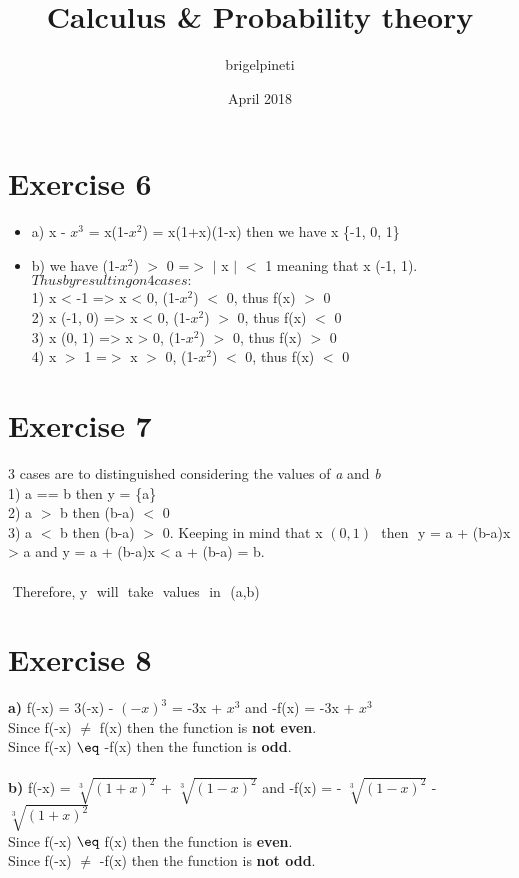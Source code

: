 \documentclass{article}
\title{Calculus & Probability theory}
\author{brigelpineti }
\date{April 2018}
\begin{document}
  \maketitle
  \section*{Exercise 6}
  \begin{itemize}
  
  \item a) x - $x^3$ = x(1-$x^2$) = x(1+x)(1-x) then we have x \in \{-1, 0, 1\} 
  
  \item b) we have (1-$x^2$) $>$ 0 =$>$ $\vert$ x $\vert$ $<$ 1 meaning that x \in (-1, 1). \\ 
  $Thus by resulting on 4 cases:$ \\
  1) x < -1 => x < 0, (1-$x^2$) $<$ 0, thus f(x) $>$ 0 \\
  2) x \in (-1, 0) => x < 0, (1-$x^2$) $>$ 0, thus f(x) $<$ 0 \\
  3) x \in (0, 1) => x > 0, (1-$x^2$) $>$ 0, thus f(x) $>$ 0 \\
  4) x $>$ 1 =$>$ x $>$ 0, (1-$x^2$) $<$ 0, thus f(x) $<$ 0
  \end{itemize}
  
  \section*{Exercise 7}
  
  3 cases are to distinguished considering the values of \textit{a} and \textit{b} \\
  1) a == b then y = \{a\} \\
  2) a $>$ b then (b-a) $<$ 0 \\
  3) a $<$ b then (b-a) $>$ 0. Keeping in mind that x \in $(0,1)$ $ $ then $ $ y = a + (b-a)x > a and y = a + (b-a)x < a + (b-a) = b.  $ $\\ \\
  $ $ Therefore, y $ $ will $ $ take $ $ values $ $ in $ $ (a,b) \\ 
  
  \section*{Exercise 8}
  
  \textbf{a)} f(-x) = 3(-x) - $(-x)^3$ = -3x + $x^3$ and -f(x) = -3x + $x^3$ \\
  Since f(-x) $\neq$ f(x) then the function is \textbf{not even}. \\
  Since f(-x) $\eq$ -f(x) then the function is \textbf{odd}. \\ \\
  \textbf{b)} f(-x) = $\sqrt[3]{(1+x)^2}$ + $\sqrt[3]{(1-x)^2}$ and -f(x) = - $\sqrt[3]{(1-x)^2}$ - $\sqrt[3]{(1+x)^2}$ \\
  Since f(-x) $\eq$ f(x) then the function is \textbf{even}. \\
  Since f(-x) $\neq$ -f(x) then the function is \textbf{not odd}. 
  
  
\end{document}
